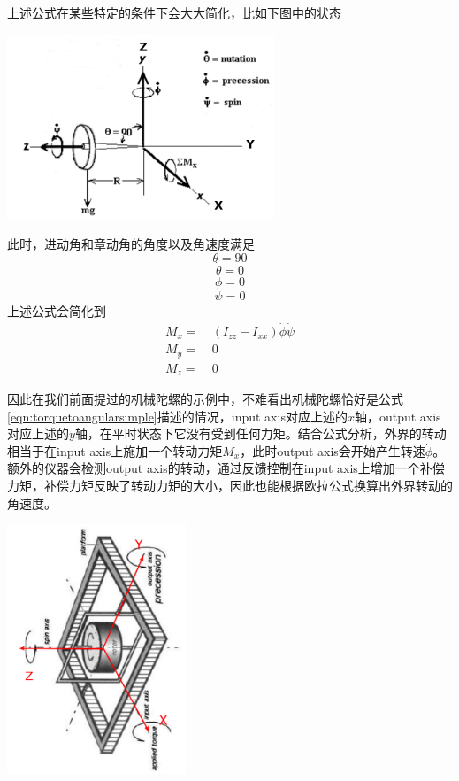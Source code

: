 \documentclass[11pt]{article}
\begin{document}
上述公式在某些特定的条件下会大大简化，比如下图中的状态

\begin{center}
\includegraphics[width=0.6\textwidth]{images/gyroframe2.png}
\end{center}

此时，进动角和章动角的角度以及角速度满足
$$
\theta = 90
$$
$$
\dot{\theta} = 0
$$
$$
\ddot{\phi} = 0
$$
$$
\ddot{\psi} = 0
$$
上述公式会简化到
\begin{align}\label{eqn:torquetoangularsimple}
M_x = &	\ (I_{zz}-I_{xx})\dot{\phi}\dot{\psi} \\ 
M_y = & \ 0	\\
M_z = & \ 0
\end{align}

因此在我们前面提过的机械陀螺的示例中，不难看出机械陀螺恰好是公式\ref{eqn:torquetoangularsimple}描述的情况，input axis对应上述的$x$轴，output axis对应上述的$y$轴，在平时状态下它没有受到任何力矩。结合公式分析，外界的转动相当于在input axis上施加一个转动力矩$M_x$，此时output axis会开始产生转速$\dot{\phi}$。额外的仪器会检测output axis的转动，通过反馈控制在input axis上增加一个补偿力矩，补偿力矩反映了转动力矩的大小，因此也能根据欧拉公式换算出外界转动的角速度。

\begin{center}
\includegraphics[width=0.4\textwidth]{images/gyroscopeAxesR.png}
\end{center}
\end{document}
